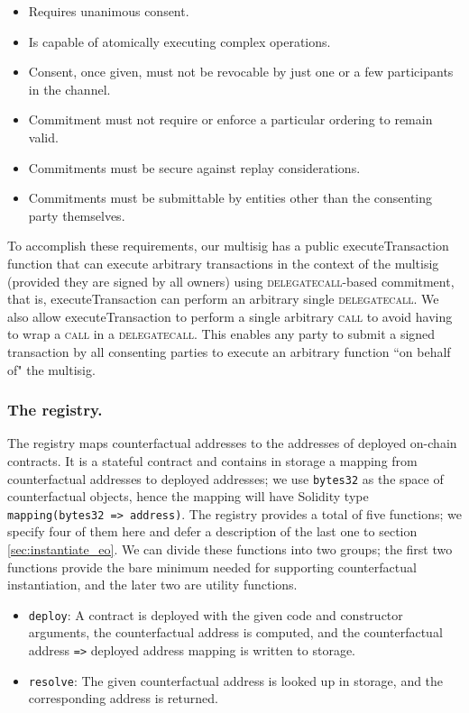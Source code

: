 \documentclass[prb,floatfix,reprint,nofootinbib,amsmath,amssymb,epsfig,pre,floats,letterpaper,groupedaffiliation,tightenlines,allcolors=blue,11pt]{revtex4}
\theoremstyle{definition}
\theoremstyle{definition}
\theoremstyle{definition}
\begin{document}
\begin{itemize}
\setlength\itemsep{0em}
\item Requires unanimous consent.
\item Is capable of atomically executing complex operations.
\item Consent, once given, must not be revocable by just one or a few participants in the channel.
\item Commitment must not require or enforce a particular ordering to remain valid.
\item Commitments must be secure against replay considerations.
\item Commitments must be submittable by entities other than the consenting party themselves.
\end{itemize}

To accomplish these requirements, our multisig has a public \textsf{executeTransaction} function that can execute arbitrary transactions in the context of the multisig (provided they are signed by all owners) using \textsc{delegatecall}-based commitment, that is, \textsf{executeTransaction} can perform an arbitrary single \textsc{delegatecall}. We also allow \textsf{executeTransaction} to perform a single arbitrary \textsc{call} to avoid having to wrap a \textsc{call} in a \textsc{delegatecall}. This enables any party to submit a signed transaction by all consenting parties to execute an arbitrary function ``on behalf of" the multisig.

\subsubsection{The registry.}

The registry maps counterfactual addresses to the addresses of deployed on-chain contracts. It is a stateful contract and contains in storage a mapping from counterfactual addresses to deployed addresses; we use \texttt{bytes32} as the space of counterfactual objects, hence the mapping will have Solidity type \texttt{mapping(bytes32 => address)}. The registry provides a total of five functions; we specify four of them here and defer a description of the last one to section \ref{sec:instantiate_eo}. We can divide these functions into two groups; the first two functions provide the bare minimum needed for supporting counterfactual instantiation, and the later two are utility functions.

\begin{itemize}
\setlength\itemsep{0em}
\item \texttt{deploy}: A contract is deployed with the given code and constructor arguments, the counterfactual address is computed, and the counterfactual address \texttt{=>} deployed address mapping is written to storage.
\item \texttt{resolve}: The given counterfactual address is looked up in storage, and the corresponding address is returned.
\end{itemize}
\end{document}
